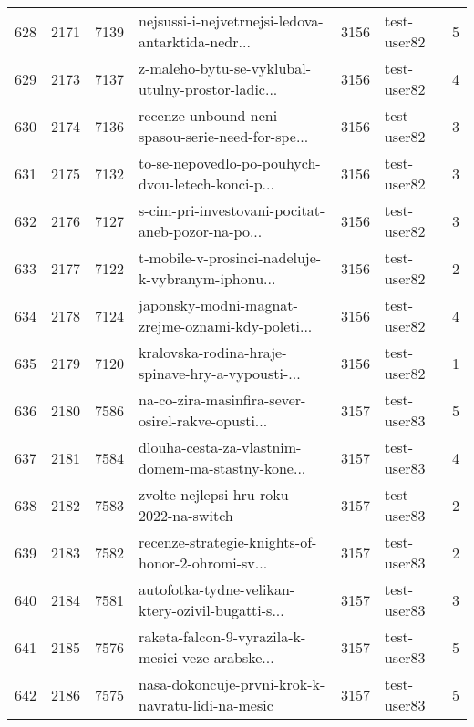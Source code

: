\begin{tabular}{lrrlrlr}
628  &       2171 &     7139 &  nejsussi-i-nejvetrnejsi-ledova-antarktida-nedr... &     3156 &                  test-user82 &               5 \\
629  &       2173 &     7137 &  z-maleho-bytu-se-vyklubal-utulny-prostor-ladic... &     3156 &                  test-user82 &               4 \\
630  &       2174 &     7136 &  recenze-unbound-neni-spasou-serie-need-for-spe... &     3156 &                  test-user82 &               3 \\
631  &       2175 &     7132 &  to-se-nepovedlo-po-pouhych-dvou-letech-konci-p... &     3156 &                  test-user82 &               3 \\
632  &       2176 &     7127 &  s-cim-pri-investovani-pocitat-aneb-pozor-na-po... &     3156 &                  test-user82 &               3 \\
633  &       2177 &     7122 &  t-mobile-v-prosinci-nadeluje-k-vybranym-iphonu... &     3156 &                  test-user82 &               2 \\
634  &       2178 &     7124 &  japonsky-modni-magnat-zrejme-oznami-kdy-poleti... &     3156 &                  test-user82 &               4 \\
635  &       2179 &     7120 &  kralovska-rodina-hraje-spinave-hry-a-vypousti-... &     3156 &                  test-user82 &               1 \\
636  &       2180 &     7586 &  na-co-zira-masinfira-sever-osirel-rakve-opusti... &     3157 &                  test-user83 &               5 \\
637  &       2181 &     7584 &  dlouha-cesta-za-vlastnim-domem-ma-stastny-kone... &     3157 &                  test-user83 &               4 \\
638  &       2182 &     7583 &            zvolte-nejlepsi-hru-roku-2022-na-switch &     3157 &                  test-user83 &               2 \\
639  &       2183 &     7582 &  recenze-strategie-knights-of-honor-2-ohromi-sv... &     3157 &                  test-user83 &               2 \\
640  &       2184 &     7581 &  autofotka-tydne-velikan-ktery-ozivil-bugatti-s... &     3157 &                  test-user83 &               3 \\
641  &       2185 &     7576 &  raketa-falcon-9-vyrazila-k-mesici-veze-arabske... &     3157 &                  test-user83 &               5 \\
642  &       2186 &     7575 &  nasa-dokoncuje-prvni-krok-k-navratu-lidi-na-mesic &     3157 &                  test-user83 &               5 \\

\end{tabular}
